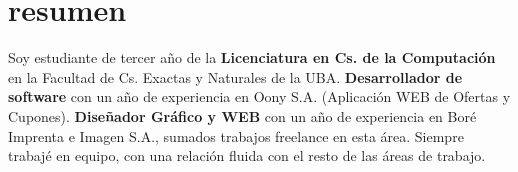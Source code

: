 \documentclass[espanol]{cv-style}     %
\begin{document}
	\section{resumen}
	\vspace{-0.2cm}
	Soy estudiante de tercer año de la \textbf{Licenciatura en Cs. de la Computación} en la Facultad de Cs. Exactas y Naturales de la UBA. \textbf{Desarrollador de software} con un año de experiencia en Oony S.A. (Aplicación WEB de Ofertas y Cupones). \textbf{Diseñador Gráfico y WEB} con un año de experiencia en Boré Imprenta e Imagen S.A., sumados trabajos freelance en esta área. Siempre trabajé en equipo, con una relación fluida con el resto de las áreas de trabajo.
\end{document}
